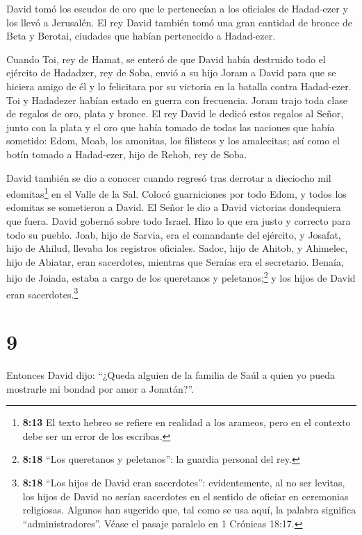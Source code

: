 David tomó los escudos de oro que le pertenecían a los
oficiales de Hadad-ezer y los llevó a Jerusalén.  El rey
David también tomó una gran cantidad de bronce de Beta y Berotai,
ciudades que habían pertenecido a Hadad-ezer.

 Cuando Toi, rey de Hamat, se enteró de que David había
destruido todo el ejército de Hadadzer, rey de Soba,  envió
a su hijo Joram a David para que se hiciera amigo de él y lo felicitara
por su victoria en la batalla contra Hadad-ezer. Toi y Hadadezer habían
estado en guerra con frecuencia. Joram trajo toda clase de regalos de
oro, plata y bronce.  El rey David le dedicó estos regalos
al Señor, junto con la plata y el oro que había tomado de todas las
naciones que había sometido:  Edom, Moab, los amonitas, los
filisteos y los amalecitas; así como el botín tomado a Hadad-ezer, hijo
de Rehob, rey de Soba.

 David también se dio a conocer cuando regresó tras
derrotar a dieciocho mil edomitas\footnote{\textbf{8:13} El texto hebreo
  se refiere en realidad a los arameos, pero en el contexto debe ser un
  error de los escribas.} en el Valle de la Sal.  Colocó
guarniciones por todo Edom, y todos los edomitas se sometieron a David.
El Señor le dio a David victorias dondequiera que fuera. 
David gobernó sobre todo Israel. Hizo lo que era justo y correcto para
todo su pueblo.  Joab, hijo de Sarvia, era el comandante
del ejército, y Josafat, hijo de Ahilud, llevaba los registros
oficiales.  Sadoc, hijo de Ahitob, y Ahimelec, hijo de
Abiatar, eran sacerdotes, mientras que Seraías era el secretario.
 Benaía, hijo de Joiada, estaba a cargo de los queretanos y
peletanos;\footnote{\textbf{8:18} ``Los queretanos y peletanos'': la
  guardia personal del rey.} y los hijos de David eran
sacerdotes.\footnote{\textbf{8:18} ``Los hijos de David eran
  sacerdotes'': evidentemente, al no ser levitas, los hijos de David no
  serían sacerdotes en el sentido de oficiar en ceremonias religiosas.
  Algunos han sugerido que, tal como se usa aquí, la palabra significa
  ``administradores''. Véase el pasaje paralelo en 1 Crónicas 18:17.}

\hypertarget{section-8}{%
\section{9}\label{section-8}}

 Entonces David dijo: ``¿Queda alguien de la familia de Saúl
a quien yo pueda mostrarle mi bondad por amor a Jonatán?''.


